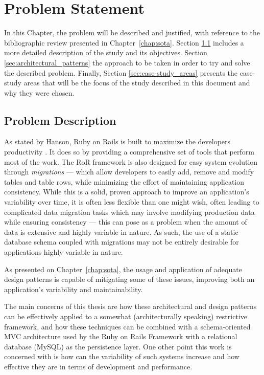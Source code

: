\chapter{Problem Statement}\label{chap:problem_statement}

In this Chapter, the problem will be described and justified, with reference to the bibliographic review presented in Chapter~\ref{chap:sota}. Section \ref{sec:problem_description} includes a more detailed description of the study and its objectives. Section \ref{sec:architectural_patterns} the approach to be taken in order to try and solve the described problem. Finally, Section \ref{sec:case-study_areas} presents the case-study areas that will be the focus of the study described in this document and why they were chosen.

\section{Problem Description}\label{sec:problem_description}

As stated by Hanson, Ruby on Rails is built to maximize the developers productivity \cite{rubyonrails}. It does so by providing a comprehensive set of tools that perform most of the work. The RoR framework is also designed for easy system evolution through \emph{migrations} --- which allow developers to easily add, remove and modify tables and table rows, while minimizing the effort of maintaining application consistency. While this is a solid, proven approach to improve an application's variability over time, it is often less flexible than one might wish, often leading to complicated data migration tasks which may involve modifying production data while ensuring consistency --- this can pose as a problem when the amount of data is extensive and highly variable in nature. As such, the use of a static database schema coupled with migrations may not be entirely desirable for applications highly variable in nature.

As presented on Chapter~\ref{chap:sota}, the usage and application of adequate design patterns is capable of mitigating some of these issues, improving both an application's variability and maintainability.

The main concerns of this thesis are how these architectural and design patterns can be effectively applied to a somewhat (architecturally speaking) restrictive framework, and how these techniques can be combined with a schema-oriented MVC architecture used by the Ruby on Rails Framework with a relational database (MySQL) as the persistence layer. One other point this work is concerned with is how can the variability of such systems increase and how effective they are in terms of development and performance.

